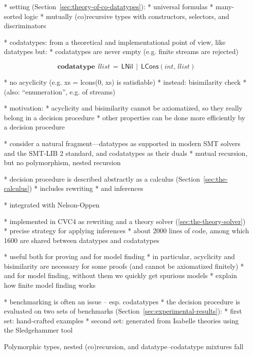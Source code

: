 \documentclass[a4paper,oribibl,envcountsame,draft]{llncs}
\newcommand\keyw[1]{\textbf{#1}}
\newcommand\const[1]{\textsf{#1}}
\newcommand\ty[1]{\textit{#1}}
\begin{document}
  * setting (Section~\ref{sec:theory-of-co-datatypes}):
    * universal formulas
    * many-sorted logic
    * mutually (co)recursive types with constructors, selectors, and
      discriminators

  * codatatypes: from a theoretical and implementational point of view, like
      datatypes but:
    * codatatypes are never empty (e.g. finite streams are rejected)

\[
      \keyw{codatatype}\; \,\ty{llist} \,=\, \const{LNil} \,\mid\, \const{LCons}(\ty{int},\, \ty{llist})
\]

    * no acyclicity (e.g. xs = lcons(0, xs) is satisfiable)
    * instead: bisimilarity check
    * (also: ``enumeration'', e.g. of streams)

  * motivation:
    * acyclicity and bisimilarity cannot be axiomatized, so they really belong in
      a decision procedure
    * other properties can be done more efficiently by a decision procedure

  * consider a natural fragment---datatypes as supported in modern SMT solvers
    and the SMT-LIB 2 standard, and codatatypes as their duals
    * mutual recursion, but no polymorphism, nested recursion

  * decision procedure is described abstractly as a calculus
    (Section~\ref{sec:the-calculus})
    * includes rewriting
    * and inferences

  * integrated with Nelson-Oppen

  * implemented in CVC4 as rewriting and a theory solver
    (\ref{sec:the-theory-solver})
    * precise strategy for applying inferences
    * about 2000 lines of code, among which 1600 are shared between datatypes
      and codatatypes

  * useful both for proving and for model finding
    * in particular, acyclicity and bisimilarity are necessary for some proofs
      (and cannot be axiomatized finitely)
    * and for model finding, without them we quickly get spurious models
    * explain how finite model finding works


  * benchmarking is often an issue -- esp. codatatypes
  * the decision procedure is evaluated on two sets of benchmarks
    (Section~\ref{sec:experimental-results}):
    * first set: hand-crafted examples
    * second set: generated from Isabelle theories using the Sledgehammer tool

Polymorphic types, nested (co)recursion, and datatype--codatatype mixtures fall
\end{document}
